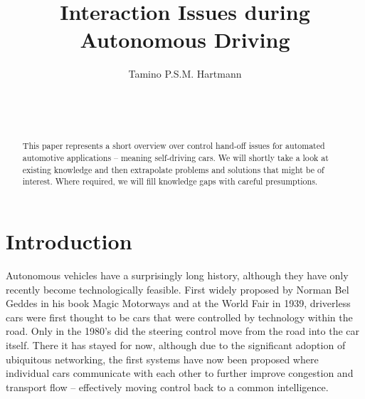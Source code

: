 \documentclass{acm_proc_article-sp}
\begin{document}

\title{Interaction Issues during Autonomous Driving}

\author{
\alignauthor
Tamino P.S.M. Hartmann\\
       \\
       \\
       \\
}


\maketitle
\begin{abstract}
This paper represents a short overview over control hand-off issues for automated automotive applications – meaning self-driving cars.
We will shortly take a look at existing knowledge and then extrapolate problems and solutions that might be of interest.
Where required, we will fill knowledge gaps with careful presumptions.
\end{abstract}


\section{Introduction}

Autonomous vehicles have a surprisingly long history, although they have only recently become technologically feasible.
First widely proposed by Norman Bel Geddes in his book Magic Motorways \cite{geddes2009magic} and at the World Fair in 1939, driverless cars were first thought to be cars that were controlled by technology within the road.
Only in the 1980's did the steering control move from the road into the car itself.
There it has stayed for now, although due to the significant adoption of ubiquitous networking, the first systems have now been proposed where individual cars communicate with each other to further improve congestion and transport flow – effectively moving control back to a common intelligence.
\end{document}
